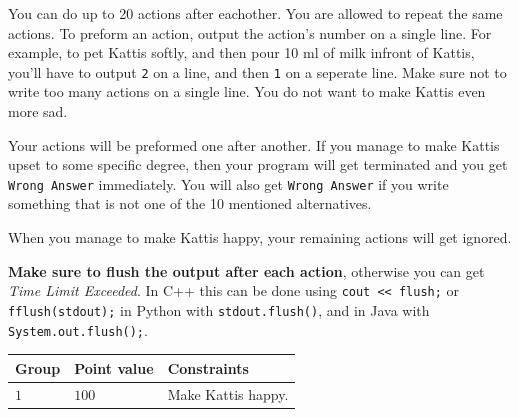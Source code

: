 You can do up to 20 actions after eachother. You are allowed to repeat the same actions.
To preform an action, output the action's number on a single line. For example, to pet Kattis softly, 
and then pour 10 ml of milk infront of Kattis, you'll have to output \texttt{2} on a line, and then \texttt{1} on a seperate line.
Make sure not to write too many actions on a single line. You do not want to make Kattis even more sad.

Your actions will be preformed one after another. If you manage to make Kattis upset to some specific degree,
then your program will get terminated and you get \texttt{Wrong Answer} immediately.
You will also get \texttt{Wrong Answer} if you write something that is not one of the 10 mentioned alternatives.

When you manage to make Kattis happy, your remaining actions will get ignored.


\textbf{Make sure to flush the output after each action}, otherwise you can get \textit{Time Limit Exceeded}.
In C++ this can be done using \texttt{cout << flush;}
or \texttt{fflush(stdout);}
in Python with \texttt{stdout.flush()},
and in Java with \texttt{System.out.flush();}.


\noindent
\begin{tabular}{| l | l | l |}
  \hline
  \textbf{Group} & \textbf{Point value} & \textbf{Constraints} \\ \hline
  $1$   & $100$        & Make Kattis happy. \\ \hline
\end{tabular}
